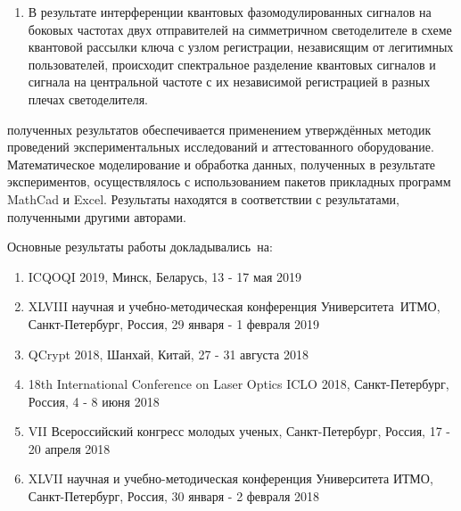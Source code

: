 \begin{enumerate}
  
 
 \item В результате интерференции квантовых фазомодулированных сигналов на боковых частотах двух отправителей на симметричном светоделителе в схеме квантовой рассылки ключа с узлом регистрации, независящим от легитимных пользователей, происходит спектральное разделение квантовых сигналов и сигнала на центральной частоте с их независимой регистрацией в разных плечах светоделителя.
 
 
\end{enumerate}

{\reliability} полученных результатов обеспечивается применением утверждённых методик проведений экспериментальных исследований и аттестованного оборудование. Математическое моделирование и обработка данных, полученных в результате экспериментов, осуществлялось с использованием пакетов прикладных программ MathCad и Excel. Результаты находятся в соответствии с результатами, полученными другими авторами.


{\probation}
Основные результаты работы докладывались~на:
\begin{enumerate}
	\item ICQOQI 2019, Минск, Беларусь, 13 - 17 мая 2019
	\item XLVIII научная и учебно-методическая конференция Университета~ИТМО, Санкт-Петербург, Россия, 29 января - 1 февраля 2019
	\item QCrypt 2018, Шанхай, Китай, 27 - 31 августа 2018
	\item 18th International Conference on Laser Optics ICLO 2018, Санкт-Петербург, Россия, 4 - 8 июня 2018
	\item VII Всероссийский конгресс молодых ученых, Санкт-Петербург, Россия, 17 - 20 апреля 2018
	\item XLVII научная и учебно-методическая конференция Университета ИТМО, Санкт-Петербург, Россия, 30 января - 2 февраля 2018
\end{enumerate}

